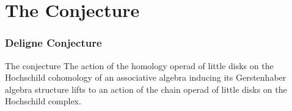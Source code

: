 \documentclass{beamer}
\theoremstyle{definition}
\newcommand{\CC}{\mathcal{C}}
\begin{document}
%	
%



\section{The Conjecture}
\begin{frame}
	\frametitle{Deligne Conjecture}
	\begin{block}{The conjecture}
	The action of the homology operad of little disks on the Hochschild cohomology of an associative algebra inducing its Gerstenhaber algebra structure lifts to an action of the chain operad of little disks on the Hochschild complex.
	\end{block}
	
\end{frame}
\end{document}
